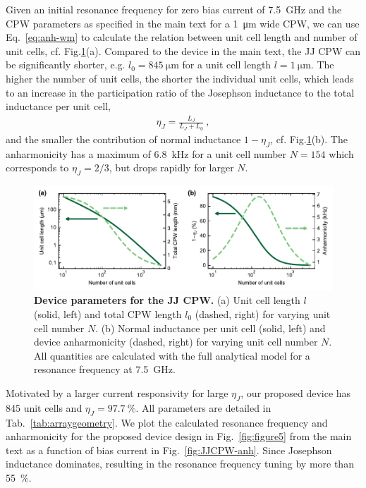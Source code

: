 Given an initial resonance frequency for zero bias current of \SI{7.5}{\giga\hertz} and the CPW parameters as specified in the main text for a \SI{1}{\micro\meter} wide CPW, we can use Eq.~\eqref{eq:anh-wm} to calculate the relation between unit cell length and number of unit cells, cf. Fig.\ref{fig:JJCPW}(a).
% 
Compared to the device in the main text, the JJ CPW can be significantly shorter, e.g. $l_0=\SI{845}{\micro\meter}$ for a unit cell length $l=\SI{1}{\micro\meter}$.
% 
The higher the number of unit cells, the shorter the individual unit cells, which leads to an increase in the participation ratio of the Josephson inductance to the total inductance per unit cell, 
% 
\begin{align}
\eta_J = \frac{L_J}{L_J+L_0} \ ,
\end{align}
% 
and the smaller the contribution of normal inductance $1-\eta_J$, cf. Fig.\ref{fig:JJCPW}(b).
% 
The anharmonicity has a maximum of \SI{6.8}{\kilo\hertz} for a unit cell number $N=154$ which corresponds to $\eta_J=2/3$, but drops rapidly for larger $N$.

\begin{figure}
	\centering
	\includegraphics[width=\linewidth]{chapter-currentdetection/figures/SM_JJarrayCPW_vs_N}
	\caption{
		\textbf{Device parameters for the JJ CPW.}
		(a) Unit cell length $l$ (solid, left) and total CPW length $l_0$ (dashed, right) for varying unit cell number $N$.
		(b) Normal inductance per unit cell (solid, left) and device anharmonicity (dashed, right) for varying unit cell number $N$.
		All quantities are calculated with the full analytical model for a resonance frequency at \SI{7.5}{\giga\hertz}.
	}
	\label{fig:JJCPW}
\end{figure}

Motivated by a larger current responsivity for large $\eta_J$, our proposed device has 845 unit cells and $\eta_J=\SI{97.7}{\percent}$.
% 
All parameters are detailed in Tab.~\ref{tab:arraygeometry}.
% 
We plot the calculated resonance frequency and anharmonicity for the proposed device design in Fig.~\ref{fig:figure5} from the main text as a function of bias current in Fig.~\ref{fig:JJCPW-anh}.
% 
Since Josephson inductance dominates, resulting in the resonance frequency tuning by more than \SI{55}{\percent}.

